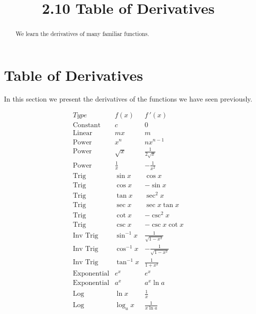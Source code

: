 \documentclass[handout]{ximera}
\title{2.10 Table of Derivatives}
\begin{document}
\begin{abstract}
We learn the derivatives of many familiar functions.
\end{abstract}

\maketitle


\section{Table of Derivatives}

In this section we present the derivatives of the functions we have seen previously.  

\begin{center}
\[
\begin{array}{c|c|c}
		Type & f(x) & f\,'(x)  \\
		\hline
		\text{Constant} & c & 0 \\[8pt]
		\text{Linear} & mx & m  \\[8pt]
		\text{Power} & x^n & nx^{n-1}  \\[8pt]
		\hline
		\text{Power} & \sqrt x & \displaystyle \frac{1}{2\sqrt x}\\[8pt]
		\text{Power} & \displaystyle \frac{1}{x} & -\displaystyle \frac{1}{x^2}\\[8pt]
	  \hline
		\text{Trig} & \sin x & \cos x \\[8pt]
		\text{Trig} & \cos x & -\sin x \\[8pt]
		\hline
		\text{Trig} & \tan x & \sec^2 x \\[8pt]
		\text{Trig} & \sec x & \sec x\tan x \\[8pt]
		\hline
		\text{Trig} & \cot x & -\csc^2 x \\[8pt]
		\text{Trig} & \csc x & -\csc x\cot x \\[8pt]
		\hline
		\text{Inv Trig} & \sin^{-1} x & \displaystyle{\frac{1}{\sqrt{1-x^2}}} \\[8pt]
		\text{Inv Trig} & \cos^{-1} x & \displaystyle{-\frac{1}{\sqrt{1-x^2}}} \\[8pt]
		\text{Inv Trig} & \tan^{-1} x & \displaystyle{\frac{1}{1+x^2}} \\[8pt]
		\hline
		\text{Exponential} & e^x & e^x \\[8pt]
		\text{Exponential} & a^x & a^x\ln a \\[8pt]
		\hline
		\text{Log} & \ln x & \displaystyle{\frac{1}{x}} \\[8pt]
		\text{Log} & \log_a x & \displaystyle{\frac{1}{x\ln a}}
	\end{array}
    \]
\end{center}
\end{document}
